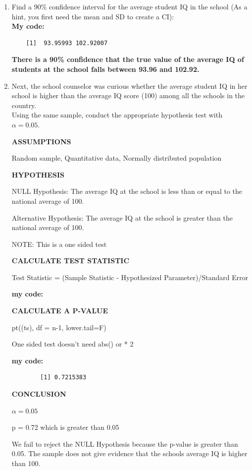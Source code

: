 \documentclass[12pt,letterpaper]{article}
\begin{document}
\begin{enumerate}
	\item Find a 90\% confidence interval for the average student IQ in the school (As a hint, you first need the mean and SD to create a CI):\\	
	\textbf{My code:}
	 
	\begin{verbatim}
	[1]  93.95993 102.92007	
	\end{verbatim}
	\textbf{There is a 90\% confidence that the true value of the average IQ of students at the school falls between 93.96 and 102.92.}
	
	\item Next, the school counselor was curious  whether  the average student IQ in her school is higher than the average IQ score (100) among all the schools in the country.\\ 
	
	\noindent Using the same sample, conduct the appropriate hypothesis test with $\alpha=0.05$.
	
	\textbf{ASSUMPTIONS}
	
	Random sample, Quantitative data, Normally distributed population
	
	\textbf{HYPOTHESIS}	
	
	NULL Hypothesis: The average IQ at the school is less than or equal to the national average of 100.
	
	Alternative Hypothesis: The average IQ at the school is greater than the national average of 100.
	
	NOTE: This is a one sided test
	
	\textbf{CALCULATE TEST STATISTIC}
	
	Test Statistic = (Sample Statistic - Hypothesized Parameter)/Standard Error
	
	\textbf{my code:}
	
	
	\textbf{CALCULATE A P-VALUE}
	
	pt((ts), df = n-1, lower.tail=F) 
	
	One sided test doesn't need abs() or * 2
	
	\textbf{my code:}
	
	\begin{verbatim}
		[1] 0.7215383
	\end{verbatim}
	
	\textbf{CONCLUSION}
	
	$\alpha = 0.05$
	
	p = 0.72 which is greater than 0.05
	
	We fail to reject the NULL Hypothesis because the p-value is greater than 0.05. The sample does not give evidence that the schools average IQ is higher than 100.
	
	
\end{enumerate}
\end{document}
